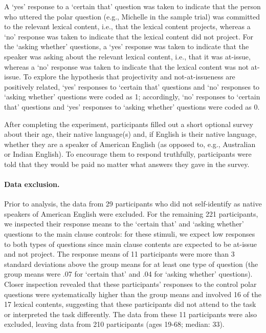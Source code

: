 \documentclass[11pt,fleqn]{article}
\newcommand{\6}{\mbox{$[\hspace*{-.6mm}[$}}
\newcommand{\9}{\mbox{$]\hspace*{-.6mm}]$}}
\begin{document}
A `yes' response to a `certain that' question was taken to indicate that the person who uttered the polar question (e.g., Michelle in the sample trial) was committed to the relevant lexical content, i.e., that the lexical content projects, whereas a `no' response was taken to indicate that the lexical content did not project. For the `asking whether' questions, a `yes'  response was taken to indicate that the speaker was asking about the relevant lexical content, i.e., that it was at-issue, whereas a `no' response was taken to indicate that the lexical content was not at-issue. To explore the hypothesis that projectivity and not-at-issueness are positively related,  `yes' responses to `certain that' questions and `no' responses to `asking whether' questions were coded as 1; accordingly, `no' responses to `certain that' questions and `yes' responses to `asking whether' questions were coded as 0.

After completing the experiment, participants filled out a short optional survey about their age, their native language(s) and, if English is their native language, whether they are a speaker of American English (as opposed to, e.g., Australian or Indian English). To encourage them to respond truthfully, participants were told that they would be paid no matter what answers they gave in the survey.

\paragraph{Data exclusion.}
Prior to analysis, the data from 29 participants who did not self-identify as native speakers of American English were excluded. For the remaining 221 participants, we inspected their response means to the `certain that' and `asking whether' questions 
to the main clause controls: for these stimuli, we expect low responses to both types of questions since main clause contents are expected to be at-issue and not project. The response means of 11 participants were more than 3 standard deviations above the group means for at least one type of question (the group means were .07 for `certain that' and .04 for `asking whether' questions). Closer inspection revealed that these participants' responses to the control polar questions were systematically higher than the group means and involved 16 of the 17 lexical contents, suggesting that these participants did not attend to the task or interpreted the task differently. The data from these 11 participants were also excluded, leaving data from 210 participants (ages 19-68; median: 33).  
\end{document}
